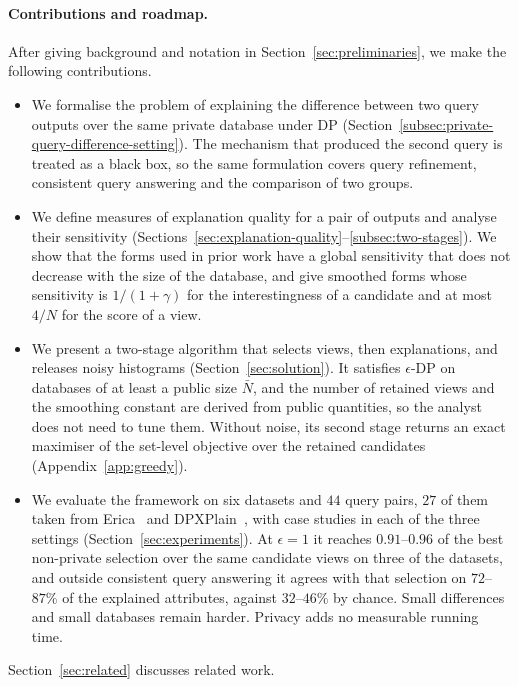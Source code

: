 \paragraph{Contributions and roadmap.}
After giving background and notation in Section~\ref{sec:preliminaries}, we make the following contributions.
\begin{itemize}[leftmargin=*]
\item We formalise the problem of explaining the difference between two query outputs over the same private database under DP (Section~\ref{subsec:private-query-difference-setting}). The mechanism that produced the second query is treated as a black box, so the same formulation covers query refinement, consistent query answering and the comparison of two groups.
\item We define measures of explanation quality for a pair of outputs and analyse their sensitivity (Sections~\ref{sec:explanation-quality}--\ref{subsec:two-stages}). We show that the forms used in prior work have a global sensitivity that does not decrease with the size of the database, and give smoothed forms whose sensitivity is $1/(1+\gamma)$ for the interestingness of a candidate and at most $4/N$ for the score of a view.
\item We present a two-stage algorithm that selects views, then explanations, and releases noisy histograms (Section~\ref{sec:solution}). It satisfies $\epsilon$-DP on databases of at least a public size $\bar N$, and the number of retained views and the smoothing constant are derived from public quantities, so the analyst does not need to tune them. Without noise, its second stage returns an exact maximiser of the set-level objective over the retained candidates (Appendix~\ref{app:greedy}).
\item We evaluate the framework on six datasets and $44$ query pairs, $27$ of them taken from Erica~\cite{LMSJ23} and DPXPlain~\cite{TaoGMR22}, with case studies in each of the three settings (Section~\ref{sec:experiments}). At $\epsilon=1$ it reaches $0.91$--$0.96$ of the best non-private selection over the same candidate views on three of the datasets, and outside consistent query answering it agrees with that selection on $72$--$87\%$ of the explained attributes, against $32$--$46\%$ by chance. Small differences and small databases remain harder. Privacy adds no measurable running time.
\end{itemize}

\noindent Section~\ref{sec:related} discusses related work.

